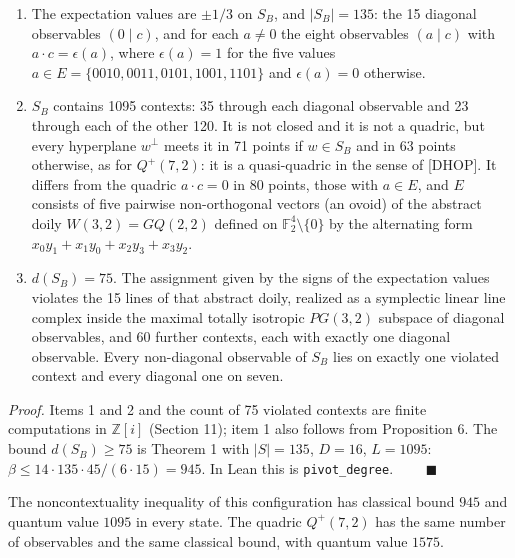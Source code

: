 \documentclass[11pt,a4paper]{article}
\providecommand{\tightlist}{\setlength{\itemsep}{0pt}\setlength{\parskip}{0pt}}
\begin{document}
\begin{enumerate}
\def\labelenumi{\arabic{enumi}.}
\tightlist
\item
  The expectation values are \(\pm 1/3\) on \(S_B\), and \(|S_B| = 135\): the 15 diagonal observables
  \((0 \mid c)\), and for each \(a \ne 0\) the eight observables \((a \mid c)\) with \(a \cdot c = \epsilon(a)\), where
  \(\epsilon(a) = 1\) for the five values \(a \in E = \{0010, 0011, 0101, 1001, 1101\}\) and \(\epsilon(a) = 0\)
  otherwise.
\item
  \(S_B\) contains 1095 contexts: 35 through each diagonal observable and 23 through each of the other
  120. It is not closed and it is not a quadric, but every hyperplane \(w^\perp\) meets it in 71 points if
  \(w \in S_B\) and in 63 points otherwise, as for \(Q^+(7,2)\): it is a quasi-quadric in the sense of
  {[}DHOP{]}. It differs from the quadric \(a \cdot c = 0\) in 80 points, those with \(a \in E\), and \(E\)
  consists of five pairwise non-orthogonal vectors (an ovoid) of the abstract doily \(W(3,2) = GQ(2,2)\) defined
  on \(\mathbb{F}_2^4 \setminus \{0\}\) by the alternating form \(x_0y_1 + x_1y_0 + x_2y_3 + x_3y_2\).
\item
  \(d(S_B) = 75\). The assignment given by the signs of the expectation values violates the 15 lines of
  that abstract doily, realized as a symplectic linear line complex inside the maximal totally isotropic
  \(PG(3,2)\) subspace of diagonal observables, and 60 further contexts, each with exactly one
  diagonal observable. Every non-diagonal observable of \(S_B\) lies on exactly one violated context and
  every diagonal one on seven.
\end{enumerate}

\emph{Proof.} Items 1 and 2 and the count of 75 violated contexts are finite computations in \(\mathbb{Z}[i]\)
(Section 11); item 1 also follows from Proposition 6. The bound \(d(S_B) \ge 75\) is Theorem 1 with
\(|S| = 135\), \(D = 16\), \(L = 1095\): \(\beta \le 14 \cdot 135 \cdot 45 / (6 \cdot 15) = 945\). In Lean this
is \texttt{pivot\_degree}. \(\qquad\blacksquare\)

The noncontextuality inequality of this configuration has classical bound \(945\) and quantum value
\(1095\) in every state. The quadric \(Q^+(7,2)\) has the same number of observables and the same classical
bound, with quantum value \(1575\).
\end{document}
